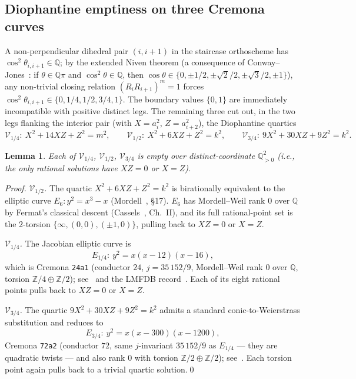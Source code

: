 \documentclass[11pt,a4paper]{article}
\newtheorem{lemma}[theorem]{Lemma}
\theoremstyle{remark}
\theoremstyle{plain}
\begin{document}
\subsection{Diophantine emptiness on three Cremona curves}

A non-perpendicular dihedral pair $(i, i+1)$ in the staircase
orthoscheme has $\cos^2 \theta_{i, i+1} \in \mathbb{Q}$; by the
extended Niven theorem (a consequence of Conway--Jones~\cite{conway-jones}:
if $\theta \in \mathbb{Q}\pi$ and $\cos^2\theta \in \mathbb{Q}$, then
$\cos\theta \in \{0, \pm 1/2, \pm\sqrt 2/2, \pm\sqrt 3/2, \pm 1\}$),
any non-trivial closing relation $(R_i R_{i+1})^m = 1$ forces
$\cos^2 \theta_{i, i+1} \in \{0, 1/4, 1/2, 3/4, 1\}$.  The boundary
values $\{0, 1\}$ are immediately incompatible with positive distinct
legs.  The remaining three cut out, in the two legs flanking the
interior pair (with $X = a_i^2$, $Z = a_{i+2}^2$), the Diophantine
quartics
\[
\mathcal{V}_{1/4} :\ X^2 + 14 X Z + Z^2 = m^2, \qquad
\mathcal{V}_{1/2} :\ X^2 + 6 X Z + Z^2 = k^2, \qquad
\mathcal{V}_{3/4} :\ 9 X^2 + 30 X Z + 9 Z^2 = k^2.
\]

\begin{lemma}\label{lem:cremona-empty}
Each of $\mathcal{V}_{1/4}$, $\mathcal{V}_{1/2}$, $\mathcal{V}_{3/4}$
is empty over distinct-coordinate $\mathbb{Q}_{>0}^2$ (i.e., the only
rational solutions have $X Z = 0$ or $X = Z$).
\end{lemma}

\begin{proof}
\emph{$\mathcal{V}_{1/2}$.}  The quartic
$X^2 + 6 X Z + Z^2 = k^2$ is birationally equivalent to the elliptic
curve $E_6 : y^2 = x^3 - x$ (Mordell~\cite{mordell-1969}, §17).
$E_6$ has Mordell--Weil rank $0$ over $\mathbb{Q}$ by Fermat's
classical descent (Cassels~\cite{cassels-1991}, Ch.~II), and its
full rational-point set is the 2-torsion
$\{\infty, (0, 0), (\pm 1, 0)\}$, pulling back to $X Z = 0$ or
$X = Z$.

\emph{$\mathcal{V}_{1/4}$.}  The Jacobian elliptic curve is
\[
E_{1/4} :\ y^2 = x(x - 12)(x - 16),
\]
which is Cremona \texttt{24a1} (conductor $24$, $j = 35\,152/9$,
Mordell--Weil rank $0$ over $\mathbb{Q}$, torsion
$\mathbb{Z}/4 \oplus \mathbb{Z}/2$); see~\cite{cremona-1997}
and the LMFDB record~\cite{lmfdb-24a1}.  Each of its eight rational
points pulls back to $X Z = 0$ or $X = Z$.

\emph{$\mathcal{V}_{3/4}$.}  The quartic $9 X^2 + 30 X Z + 9 Z^2 = k^2$
admits a standard conic-to-Weierstrass substitution and reduces to
\[
E_{3/4} :\ y^2 = x(x - 300)(x - 1200),
\]
Cremona \texttt{72a2} (conductor $72$, same $j$-invariant $35\,152/9$
as $E_{1/4}$ --- they are quadratic twists --- and also rank $0$ with
torsion $\mathbb{Z}/2 \oplus \mathbb{Z}/2$); see~\cite{cremona-1997,
lmfdb-72a2}.  Each torsion point again pulls back to a trivial
quartic solution.\qed
\end{proof}
\end{document}
